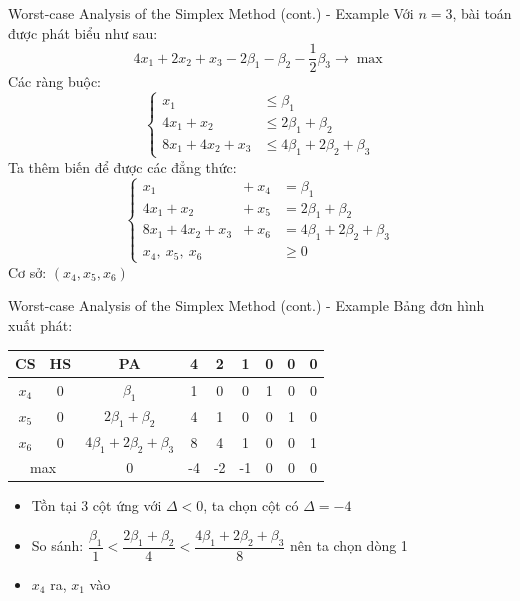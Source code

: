 \documentclass[10pt]{beamer}
\begin{document}
\begin{frame}{Worst-case Analysis of the Simplex Method (cont.) - Example}
Với $n = 3$, bài toán được phát biểu như sau:
$$
4x_1 + 2x_2 + x_3 - 2\beta_1 - \beta_2 - \frac{1}{2}\beta_3 \rightarrow \max
$$
Các ràng buộc:
$$
\left\{
\begin{array}{lll}
x_1 &\leq \beta_1\\
4x_1 + x_2 &\leq 2\beta_1 + \beta_2\\
8x_1 + 4x_2 + x_3 &\leq 4\beta_1 + 2\beta_2 + \beta_3
\end{array}
\right.
$$
Ta thêm biến để được các đẳng thức:
$$
\left\{
\begin{array}{lll}
x_1 & + \ x_4 & = \beta_1\\
4x_1 + x_2 & + \ x_5 & = 2\beta_1 + \beta_2\\
8x_1 + 4x_2 + x_3 & + \ x_6 & = 4\beta_1 + 2\beta_2 + \beta_3\\
x_4, \ x_5, \ x_6 & &\geq 0
\end{array}
\right.
$$
Cơ sở: $(x_4, x_5, x_6)$
\end{frame}

\begin{frame}{Worst-case Analysis of the Simplex Method (cont.) - Example}
Bảng đơn hình xuất phát:
\begin{table}[H]
\centering
\begin{tabular}{|c|c|c|c|c|c|c|c|c|}
\hline
CS & HS & PA & 4 & 2 & 1 & 0 & 0 & 0 \\
\hline
$x_4$ & 0 & $\beta_1$ & 1 & 0 & 0 & 1 & 0 & 0 \\
$x_5$ & 0 & $2\beta_1 + \beta_2$ & 4 & 1 & 0 & 0 & 1 & 0 \\
$x_6$ & 0 & $4\beta_1 + 2\beta_2 + \beta_3$ & 8 & 4 & 1 & 0 & 0 & 1 \\
\hline
\multicolumn{2}{|c|}{max}
& 0 & -4 & -2 & -1 & 0 & 0 & 0 \\
\hline
\end{tabular}
\end{table}
\begin{itemize}
\item Tồn tại 3 cột ứng với $\Delta < 0$, ta chọn cột có $\Delta = -4$  
\item So sánh: $\dfrac{\beta_1}{1} < \dfrac{2\beta_1 + \beta_2}{4} < \dfrac{4\beta_1 + 2\beta_2 + \beta_3}{8}$ nên ta chọn dòng 1  
\item $x_4$ ra, $x_1$ vào
\end{itemize}
\end{frame}
\end{document}
